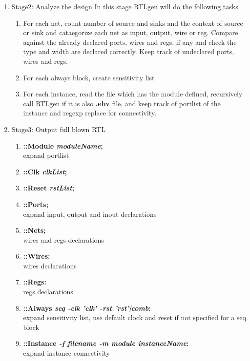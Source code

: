 \documentclass[11pt]{article}
\begin{document}
\begin{enumerate}
\item Stage2: Analyze the design
	In this stage RTLgen will do the following tasks
	\begin{enumerate}
	\item For each net, count number of source and sinks and the context of source or sink and cataegorize each net as input, output, wire or reg. Compare against the already declared ports, wires and regs, if any and check the type and width are declared correctly. Keep track of undeclared ports, wires and regs.
	\item For each always block, create sensitivity list
	\item For each instance, read the file which has the module defined, recursively call RTLgen if it is also \textbf{.ehv} file, and keep track of portlist of the instance and regexp replace for connectivity.
	\end{enumerate}
\item Stage3: Output full blown RTL
	\begin{enumerate}
	\item \textbf{::Module \emph{moduleName}; }\\
		expand portlist
	\item \textbf{::Clk \emph{clkList};}\\
	\item \textbf{::Reset \emph{rstList};}\\
	\item \textbf{::Ports;}\\
		expand input, output and inout declarations
	\item \textbf{::Nets;}\\
		wires and regs declarations
	\item \textbf{::Wires:}\\
		wires declarations
	\item \textbf{::Regs:}\\
		regs declarations
	\item \textbf{::Always \emph{seq -clk 'clk' -rst 'rst'|comb}:}\\
		expand sensitivity list, use default clock and reset if not specified for a seq block
	\item \textbf{::Instance \emph{-f filename -m module instanceName}:}\\
		expand instance connectivity
	\end{enumerate}
\end{enumerate}

\end{document}
